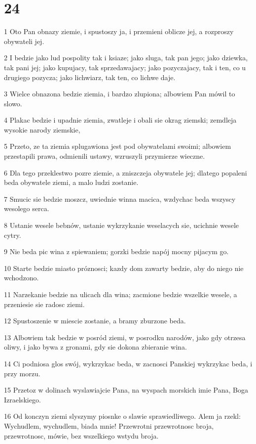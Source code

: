 \chapter{24}

\par 1 Oto Pan obnazy ziemie, i spustoszy ja, i przemieni oblicze jej, a rozproszy obywateli jej.
\par 2 I bedzie jako lud pospolity tak i ksiaze; jako sluga, tak pan jego; jako dziewka, tak pani jej; jako kupujacy, tak sprzedawajacy; jako pozyczajacy, tak i ten, co u drugiego pozycza; jako lichwiarz, tak ten, co lichwe daje.
\par 3 Wielce obnazona bedzie ziemia, i bardzo zlupiona; albowiem Pan mówil to slowo.
\par 4 Plakac bedzie i upadnie ziemia, zwatleje i obali sie okrag ziemski; zemdleja wysokie narody ziemskie,
\par 5 Przeto, ze ta ziemia splugawiona jest pod obywatelami swoimi; albowiem przestapili prawa, odmienili ustawy, wzruszyli przymierze wieczne.
\par 6 Dla tego przeklestwo pozre ziemie, a zniszczeja obywatele jej; dlatego popaleni beda obywatele ziemi, a malo ludzi zostanie.
\par 7 Smucic sie bedzie moszcz, uwiednie winna macica, wzdychac beda wszyscy wesolego serca.
\par 8 Ustanie wesele bebnów, ustanie wykrzykanie weselacych sie, ucichnie wesele cytry.
\par 9 Nie beda pic wina z spiewaniem; gorzki bedzie napój mocny pijacym go.
\par 10 Starte bedzie miasto próznosci; kazdy dom zawarty bedzie, aby do niego nie wchodzono.
\par 11 Narzekanie bedzie na ulicach dla wina; zacmione bedzie wszelkie wesele, a przeniesie sie radosc ziemi.
\par 12 Spustoszenie w miescie zostanie, a bramy zburzone beda.
\par 13 Albowiem tak bedzie w posród ziemi, w posrodku narodów, jako gdy otrzesa oliwy, i jako bywa z gronami, gdy sie dokona zbieranie wina.
\par 14 Ci podniosa glos swój, wykrzykac beda, w zacnosci Panskiej wykrzykac beda, i przy morzu.
\par 15 Przetoz w dolinach wyslawiajcie Pana, na wyspach morskich imie Pana, Boga Izraelskiego.
\par 16 Od konczyn ziemi slyszymy piosnke o slawie sprawiedliwego. Alem ja rzekl: Wychudlem, wychudlem, biada mnie! Przewrotni przewrotnosc broja, przewrotnosc, mówie, bez wszelkiego wstydu broja.
